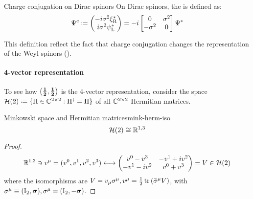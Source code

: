 \begin{definition}{Charge conjugation on Dirac spinors}{}
  On Dirac spinors, the  is defined as:
  \begin{equation}
    \Psi^c \defeq
    \begin{pmatrix}
      - i \sigma^2 \xi_\text{R}^* \\
      i \sigma^2 \psi_\text{L}^*
    \end{pmatrix}
    = -i
    \begin{bmatrix}
      0 & \sigma^2 \\ -\sigma^2 & 0
    \end{bmatrix}
    \Psi^*
    \label{eq:dir-spin-charge-conj}
  \end{equation}
\end{definition}

This definition reflect the fact that charge conjugation changes the representation of the Weyl spinors ().

\paragraph{4-vector representation}

To see how $ \mathbf{\left( \frac{1}{2},\frac{1}{2} \right)} $ is the 4-vector representation, consider the space $ \mathcal{H}(2) \defeq \{\tens{H} \in \C^{2 \times 2} : \tens{H}\dg = \tens{H}\} $ of all $ \mathbb{C}^{2 \times 2} $ Hermitian matrices.

\begin{lemma}[before upper = {\tcbtitle}]{Minkowski space and Hermitian matrices}{mink-herm-iso}
  \begin{equation}
    \mathcal{H}(2) \cong \mathbb{R}^{1,3}
  \end{equation}
\end{lemma}

\begin{proofbox}
  \begin{proof}
    \begin{equation*}
      \mathbb{R}^{1,3} \ni v^\mu = (v^0,v^1,v^2,v^3) \longleftrightarrow
      \begin{pmatrix}
        v^0 - v^3 & -v^1 + i v^2 \\
        -v^1 - i v^2 & v^0 + v^3
      \end{pmatrix}
      = V \in \mathcal{H}(2)
    \end{equation*}
    where the isomorphisms are $ V = v_\mu \sigma^\mu , v^\mu = \frac{1}{2} \operatorname{tr} \left( \bar{\sigma}^\mu V \right) $, with $ \sigma^\mu \equiv (\mathrm{I}_2,\boldsymbol{\sigma}) , \bar{\sigma}^\mu = (\mathrm{I}_2,-\boldsymbol{\sigma}) $.
  \end{proof}
\end{proofbox}

